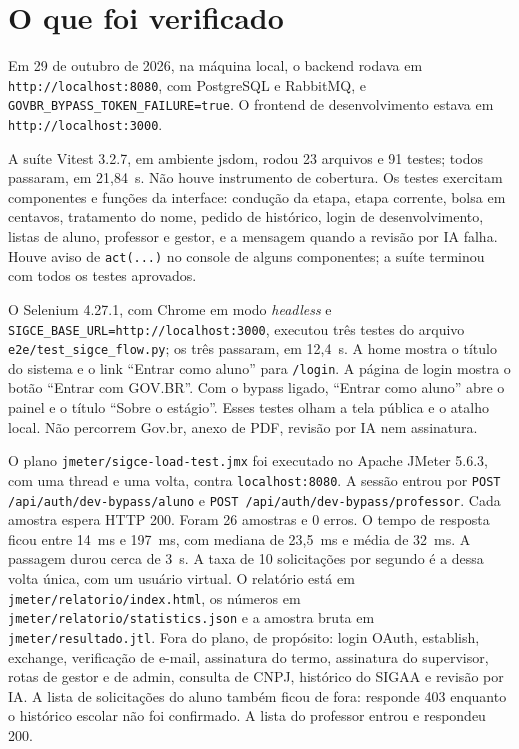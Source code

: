 \section{O que foi verificado}

Em 29 de outubro de 2026, na máquina local, o backend rodava em \texttt{http://localhost:8080}, com PostgreSQL e RabbitMQ, e \texttt{GOVBR\_BYPASS\_TOKEN\_FAILURE=true}. O frontend de desenvolvimento estava em \texttt{http://localhost:3000}.

A suíte Vitest 3.2.7, em ambiente jsdom, rodou 23 arquivos e 91 testes; todos passaram, em 21,84~s. Não houve instrumento de cobertura. Os testes exercitam componentes e funções da interface: condução da etapa, etapa corrente, bolsa em centavos, tratamento do nome, pedido de histórico, login de desenvolvimento, listas de aluno, professor e gestor, e a mensagem quando a revisão por IA falha. Houve aviso de \texttt{act(...)} no console de alguns componentes; a suíte terminou com todos os testes aprovados.

O Selenium 4.27.1, com Chrome em modo \textit{headless} e \texttt{SIGCE\_BASE\_URL=http://localhost:3000}, executou três testes do arquivo \texttt{e2e/\allowbreak test\_sigce\_flow.py}; os três passaram, em 12,4~s. A home mostra o título do sistema e o link ``Entrar como aluno'' para \texttt{/login}. A página de login mostra o botão ``Entrar com GOV.BR''. Com o bypass ligado, ``Entrar como aluno'' abre o painel e o título ``Sobre o estágio''. Esses testes olham a tela pública e o atalho local. Não percorrem Gov.br, anexo de PDF, revisão por IA nem assinatura.

O plano \texttt{jmeter/\allowbreak sigce-load-test.jmx} foi executado no Apache JMeter 5.6.3, com uma thread e uma volta, contra \texttt{localhost:8080}. A sessão entrou por \texttt{POST /api/auth/dev-bypass/aluno} e \texttt{POST /api/auth/dev-bypass/professor}. Cada amostra espera HTTP 200. Foram 26 amostras e 0 erros. O tempo de resposta ficou entre 14~ms e 197~ms, com mediana de 23,5~ms e média de 32~ms. A passagem durou cerca de 3~s. A taxa de 10 solicitações por segundo é a dessa volta única, com um usuário virtual. O relatório está em \texttt{jmeter/\allowbreak relatorio/\allowbreak index.html}, os números em \texttt{jmeter/\allowbreak relatorio/\allowbreak statistics.json} e a amostra bruta em \texttt{jmeter/\allowbreak resultado.jtl}. Fora do plano, de propósito: login OAuth, establish, exchange, verificação de e-mail, assinatura do termo, assinatura do supervisor, rotas de gestor e de admin, consulta de CNPJ, histórico do SIGAA e revisão por IA. A lista de solicitações do aluno também ficou de fora: responde 403 enquanto o histórico escolar não foi confirmado. A lista do professor entrou e respondeu 200.

